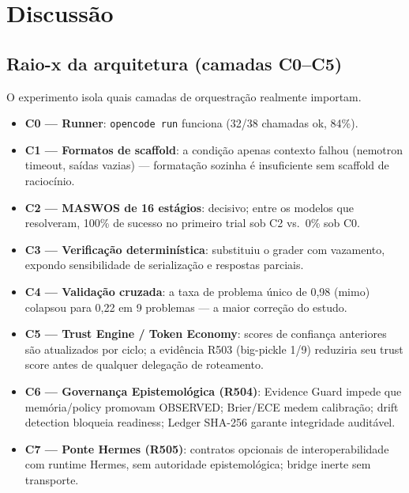 \section{Discussão}
\label{sec:discussion}

\subsection{Raio-x da arquitetura (camadas C0--C5)}
\label{sec:xray}
O experimento isola quais camadas de orquestração realmente importam.
\begin{itemize}
  \item \textbf{C0 --- Runner}: \texttt{opencode run} funciona (32/38 chamadas ok, 84\%).
  \item \textbf{C1 --- Formatos de scaffold}: a condição apenas contexto
  falhou (nemotron timeout, saídas vazias) --- formatação sozinha é
  insuficiente sem scaffold de raciocínio.
  \item \textbf{C2 --- MASWOS de 16 estágios}: decisivo; entre os modelos
  que resolveram, 100\% de sucesso no primeiro trial sob C2 vs.\ 0\% sob C0.
  \item \textbf{C3 --- Verificação determinística}: substituiu o grader com
  vazamento, expondo sensibilidade de serialização e respostas parciais.
  \item \textbf{C4 --- Validação cruzada}: a taxa de problema único de 0,98
  (mimo) colapsou para 0,22 em 9 problemas --- a maior correção do estudo.
  \item \textbf{C5 --- Trust Engine / Token Economy}: scores de confiança
  anteriores são atualizados por ciclo; a evidência R503 (big-pickle 1/9)
  reduziria seu trust score antes de qualquer delegação de roteamento.
  \item \textbf{C6 --- Governança Epistemológica (R504)}: Evidence Guard
  impede que memória/policy promovam OBSERVED; Brier/ECE medem calibração;
  drift detection bloqueia readiness; Ledger SHA-256 garante integridade
  auditável.
  \item \textbf{C7 --- Ponte Hermes (R505)}: contratos opcionais de
  interoperabilidade com runtime Hermes, sem autoridade epistemológica;
  bridge inerte sem transporte.
\end{itemize}

